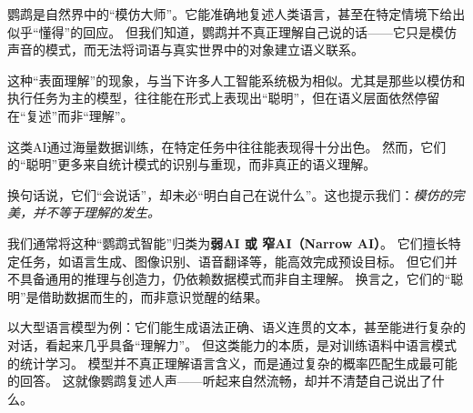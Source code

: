 

鹦鹉是自然界中的“模仿大师”。它能准确地复述人类语言，甚至在特定情境下给出似乎“懂得”的回应。
但我们知道，鹦鹉并不真正理解自己说的话——它只是模仿声音的模式，而无法将词语与真实世界中的对象建立语义联系。

这种“表面理解”的现象，与当下许多人工智能系统极为相似。尤其是那些以模仿和执行任务为主的模型，往往能在形式上表现出“聪明”，但在语义层面依然停留在“复述”而非“理解”。


这类AI通过海量数据训练，在特定任务中往往能表现得十分出色。
然而，它们的“聪明”更多来自统计模式的识别与重现，而非真正的语义理解。

换句话说，它们“会说话”，却未必“明白自己在说什么”。这也提示我们：\emph{模仿的完美，并不等于理解的发生。}


我们通常将这种“鹦鹉式智能”归类为\textbf{弱AI 或 窄AI（Narrow AI）}。
它们擅长特定任务，如语言生成、图像识别、语音翻译等，能高效完成预设目标。
但它们并不具备通用的推理与创造力，仍依赖数据模式而非自主理解。
换言之，它们的“聪明”是借助数据而生的，而非意识觉醒的结果。



以大型语言模型为例：它们能生成语法正确、语义连贯的文本，甚至能进行复杂的对话，看起来几乎具备“理解力”。
但这类能力的本质，是对训练语料中语言模式的统计学习。
模型并不真正理解语言含义，而是通过复杂的概率匹配生成最可能的回答。
这就像鹦鹉复述人声——听起来自然流畅，却并不清楚自己说出了什么。

